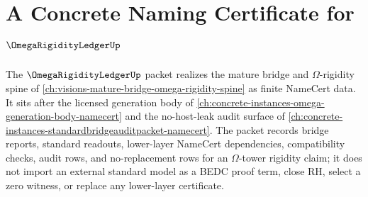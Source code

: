 \chapter{A Concrete Naming Certificate for $\OmegaRigidityLedgerUp$}
\label{ch:concrete-instances-omega-rigidity-ledger-namecert}

The $\OmegaRigidityLedgerUp$ packet realizes the mature bridge and $\Omega$-rigidity spine of \autoref{ch:visions-mature-bridge-omega-rigidity-spine} as finite NameCert data. It sits after the licensed generation body of \autoref{ch:concrete-instances-omega-generation-body-namecert} and the no-host-leak audit surface of \autoref{ch:concrete-instances-standardbridgeauditpacket-namecert}. The packet records bridge reports, standard readouts, lower-layer NameCert dependencies, compatibility checks, audit rows, and no-replacement rows for an $\Omega$-tower rigidity claim; it does not import an external standard model as a BEDC proof term, close RH, select a zero witness, or replace any lower-layer certificate.

